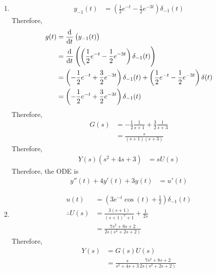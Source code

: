 \documentclass[fleqn, a4paper, 11pt, oneside]{amsart}
\theoremstyle{definition}
\theoremstyle{theorem}
\begin{document}
\begin{solution}
	\begin{enumerate}[leftmargin=*]
		\item
			\begin{align*}
				y_{-1}(t) & = \left( \frac{1}{2} e^{-t} - \frac{1}{2} e^{-3 t} \right) \delta_{-1}(t)
			\end{align*}
			Therefore,
			\begin{align*}
				g(t) & = \dod{}{t}\left( y_{-1}(t) \right)                                                                                                             \\
                     & = \dod{}{t}\left( \left( \frac{1}{2} e^{-t} - \frac{1}{2} e^{-3 t} \right) \delta_{-1}(t) \right)                                               \\
                     & = \left( -\frac{1}{2} e^{-t} + \frac{3}{2} e^{-3 t} \right) \delta_{-1}(t) + \left( \frac{1}{2} e^{-t} - \frac{1}{2} e^{-3 t} \right) \delta(t) \\
                     & = \left( -\frac{1}{2} e^{-t} + \frac{3}{2} e^{-3 t} \right) \delta_{-1}(t)
			\end{align*}
			Therefore,
			\begin{align*}
				G(s) & = -\frac{1}{2} \frac{1}{s + 1} + \frac{3}{2} \frac{1}{s + 3} \\
                     & = \frac{s}{(s + 1) (s + 3)}
			\end{align*}
			Therefore,
			\begin{align*}
				Y(s) \left( s^2 + 4 s + 3 \right) & = s U(s)
			\end{align*}
			Therefore, the ODE is
			\begin{align*}
				y''(t) + 4 y'(t) + 3 y(t) & = u'(t)
			\end{align*}
		\item
			\begin{align*}
				u(t)            & = \left( 3 e^{-t} \cos(t) + \frac{1}{2} \right) \delta_{-1}(t) \\
				\therefore U(s) & = \frac{3 (s + 1)}{(s + 1)^2 + 1} + \frac{1}{2 s}              \\
                                & = \frac{7 s^2 + 8 s + 2}{2 s \left( s^2 + 2 s + 2 \right)}
			\end{align*}
			Therefore,
			\begin{align*}
				Y(s) & = G(s) U(s) \\
                     & = \frac{s}{s^2 + 4 s + 3} \frac{7 s^2 + 8 s + 2}{2 s \left( s^2 + 2 s + 2 \right)}

\end{align*}
\end{enumerate}
\end{solution}
\end{document}

